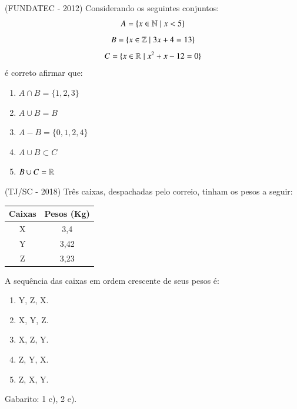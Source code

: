 \begin{exer}
(FUNDATEC - 2012)  Considerando os seguintes conjuntos:
         \[ A = \{x \in \mathbb{N} \mid x < 5\}\]
         \[ B = \{x \in \mathbb{Z} \mid 3x + 4 = 13\}\]
         \[ C = \{x \in \mathbb{R} \mid x^2 + x - 12 = 0 \} \]
   é correto afirmar que:
   \begin{enumerate}
   \item $A \cap B = \{ 1,2,3\}$
   \item $A \cup B = B$
   \item $A - B = \{0,1,2,4\}$
   \item $A \cup B \subset C$
   \item $B \cup C= \mathbb{R}$
  \end{enumerate}
\end{exer}

\begin{exer}
(TJ/SC - 2018) Três caixas, despachadas pelo correio, tinham os pesos a seguir:
 \begin{table}[H]
 \centering
 \begin{tabular}{|c|c|} \hline
 \rowcolor{cinza}
 Caixas & Pesos (Kg) \\ \hline
 X & 3,4 \\ \hline
 Y & 3,42 \\ \hline
 Z & 3,23 \\ \hline
 \end{tabular}
 \end{table}
 A sequência das caixas em ordem crescente de seus pesos é:
  \begin{enumerate}
  \item Y, Z, X.
  \item X, Y, Z.
  \item X, Z, Y.
  \item Z, Y, X.
  \item Z, X, Y.
 \end{enumerate}
\end{exer}

Gabarito: 1 c), 2 e).
